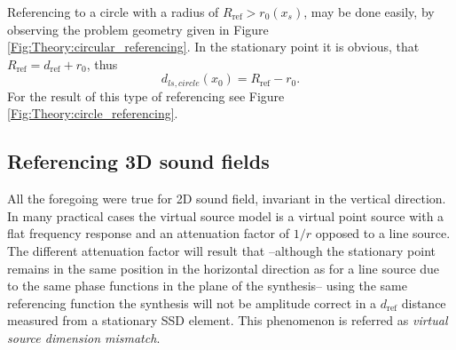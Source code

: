 \documentclass[12pt,a4paper]{article}
\newcommand{\dref}{d_{\mathrm{ref}}}
\begin{document}
Referencing to a circle with a radius of $R_{\mathrm{ref}} > r_0(x_s)$, may be done easily, by observing the problem geometry given in Figure \ref{Fig:Theory:circular_referencing}. 
In the stationary point it is obvious, that $R_{\mathrm{ref}} = \dref + r_0$, thus
\begin{equation}
d_{ls,circle}(x_0) = R_{\mathrm{ref}} - r_0.
\end{equation}
For the result of this type of referencing see Figure \ref{Fig:Theory:circle_referencing}.


\subsection{Referencing 3D sound fields}

All the foregoing were true for 2D sound field, invariant in the vertical direction. In many practical cases the virtual source model is a virtual point source with a flat frequency response and an attenuation factor of $1/r$ opposed to a line source. The different attenuation factor will result that --although the stationary point remains in the same position in the horizontal direction as for a line source due to the same phase functions in the plane of the synthesis-- using the same referencing function the synthesis will not be amplitude correct in a $\dref$ distance measured from a stationary SSD element. This phenomenon is referred as \emph{virtual source dimension mismatch}.
\end{document}
